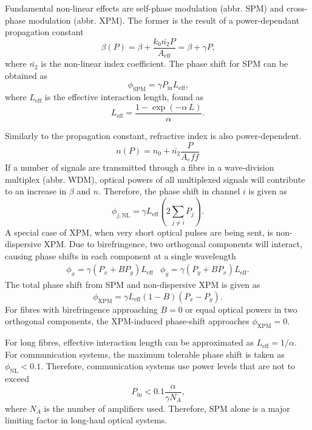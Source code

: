 \documentclass{standalone}
\begin{document}
Fundamental non-linear effects are self-phase modulation (abbr. SPM) and cross-phase modulation (abbr. XPM). The former is the result of a power-dependant propagation constant
\begin{equation}
\beta(P) = \beta + \frac{k_0 \bar{n_2} P}{A_\textrm{eff}} = \beta + \gamma P \textrm{,}
\end{equation}
where $\bar{n_2}$ is the non-linear index coefficient. The phase shift for SPM can be obtained as
\begin{equation}
\phi_\textrm{SPM} = \gamma P_\textrm{in} L_\textrm{eff} \textrm{,}
\end{equation}
where $L_\textrm{eff}$ is the effective interaction length, found as
\begin{equation}
L_\textrm{eff} = \frac{1 - \exp\left(-\alpha \, L\right)}{\alpha} \textrm{.}
\end{equation}

Similarly to the propagation constant, refractive index is also power-dependent.
\begin{equation}
n(P) = n_0 + \bar{n_2} \frac{P}{A_eff}
\end{equation}
If a number of signals are transmitted through a fibre in a wave-division multiplex (abbr. WDM), optical powers of all multiplexed signals will contribute to an increase in $\beta$ and $n$. Therefore, the phase shift in channel $i$ is given as
\begin{equation}
\phi_{j,\textrm{NL}} = \gamma L_\textrm{eff} \left( 2 \sum_{j\ne i} P_j \right) \textrm{.}
\end{equation}
A special case of XPM, when very short optical pulses are being sent, is non-dispersive XPM. Due to birefringence, two orthogonal components will interact, causing phase shifts in each component at a single wavelength
\begin{eqnarray}
\phi_x = \gamma \left(P_x + B P_y\right) L_\textrm{eff} & \phi_y = \gamma \left( P_y + B P_x \right) L_\textrm{eff} \textrm{.}
\end{eqnarray}
The total phase shift from SPM and non-dispersive XPM is given as
\begin{equation}
\phi_\textrm{XPM} = \gamma L_\textrm{eff} \left(1 - B\right) \left(P_x - P_y\right) \textrm{.}
\end{equation}
For fibres with birefringence approaching $B=0$ or equal optical powers in two orthogonal components, the XPM-induced phase-shift approaches $\phi_\textrm{XPM} = 0$.

For long fibres, effective interaction length can be approximated as $L_\textrm{eff} = 1/\alpha$. For communication systems, the maximum tolerable phase shift is taken as $\phi_\textrm{NL} < 0.1$. Therefore, communication systems use power levels that are not to exceed
\begin{equation}
P_\textrm{in} < 0.1 \frac{\alpha}{\gamma N_A} \textrm{,}
\end{equation}
where $N_A$ is the number of amplifiers used. Therefore, SPM alone is a major limiting factor in long-haul optical systems.
\end{document}
